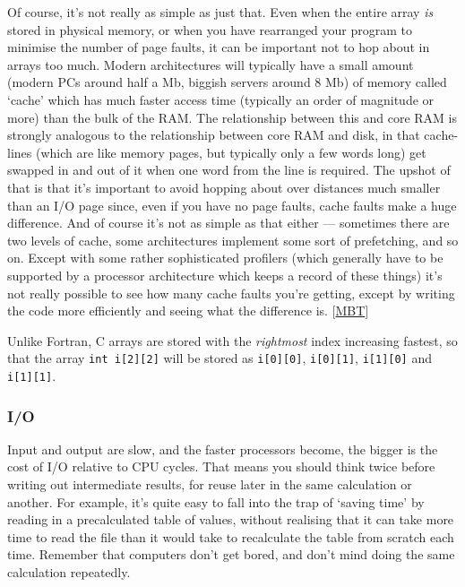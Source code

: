 \documentclass[11pt,oneside,chapters]{starlink}
\begin{document}
Of course, it's not really as simple as just
that.  Even when the entire array \emph{is} stored in
physical memory, or when you have rearranged your
program to minimise the number of page faults, it can be
important not to hop about in arrays too much.  Modern
architectures will typically have a small amount (modern
PCs around half a Mb, biggish servers around 8 Mb) of
memory called `cache' which has much faster access time
(typically an order of magnitude or more) than the bulk
of the RAM.  The relationship between this and core RAM
is strongly analogous to the relationship between core
RAM and disk, in that cache-lines (which are like memory
pages, but typically only a few words long) get swapped
in and out of it when one word from the line is
required.  The upshot of that is that it's important to
avoid hopping about over distances much smaller than an
I/O page since, even if you have no page faults, cache
faults make a huge difference.  And of course it's not
as simple as that either --- sometimes there are two
levels of cache, some architectures implement some sort
of prefetching, and so on.  Except with some rather
sophisticated profilers (which generally have to be
supported by a processor architecture which keeps a
record of these things) it's not really possible to see
how many cache faults you're getting, except by writing
the code more efficiently and seeing what the difference
is.  [\hyperlink{ta:mbt}{MBT}]

Unlike Fortran,
C arrays are stored with the \emph{rightmost} index
increasing fastest, so that the array \texttt{int i[2][2]} will be stored as
\texttt{i[0][0]},
\texttt{i[0][1]},
\texttt{i[1][0]} and
\texttt{i[1][1]}.

\subsubsection{I/O}
\label{ss:io}


Input and output are slow, and the faster processors become, the
bigger is the cost of I/O relative to CPU cycles.  That means you
should think twice before writing out intermediate results, for reuse
later in the same calculation or another.  For example, it's quite
easy to fall into the trap of `saving time' by reading in a
precalculated table of values, without realising that it can take more
time to read the file than it would take to recalculate the table from
scratch each time.  Remember that computers don't get bored, and don't
mind doing the same calculation repeatedly.
\end{document}
